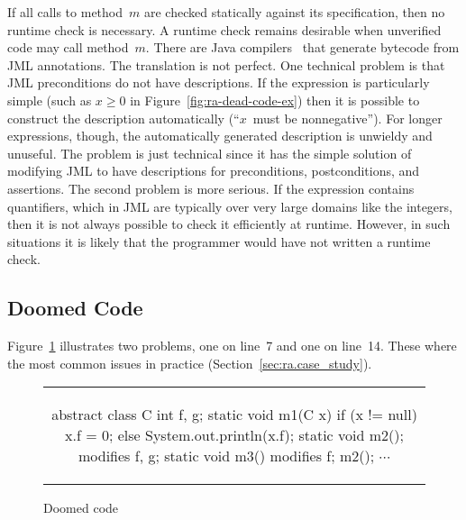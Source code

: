 \documentclass[a4paper]{article}
\newcommand{\bc}{\begin{figure}\centering\begin{tabular}{c}} %
\newcommand{\ec}[2]{\end{tabular}\caption{#1}\label{#2}\end{figure}} %
\theoremstyle{slanted}
\theoremstyle{definition}
\theoremstyle{remark}
\begin{document}
If all calls to method~$m$ are checked statically against its
specification, then no runtime check is necessary. A runtime
check remains desirable when unverified code may call method~$m$.
There are Java compilers~\cite{burdy2005jml} that generate
bytecode from JML annotations. The translation is not perfect.
One technical problem is that JML preconditions do not have
descriptions. If the expression is particularly simple (such as
$x\ge0$ in Figure~\ref{fig:ra-dead-code-ex}) then it is possible
to construct the description automatically (``$x$~must be
nonnegative''). For longer expressions, though, the automatically
generated description is unwieldy and unuseful. The problem is
just technical since it has the simple solution of modifying
JML to have descriptions for preconditions, postconditions, and
assertions. The second problem is more serious. If the expression
contains quantifiers, which in JML are typically over very large
domains like the integers, then it is not always possible to
check it efficiently at runtime. However, in such situations it
is likely that the programmer would have not written a runtime
check.


\subsection{Doomed Code}

Figure~\ref{fig:ra-doomed-code-ex} illustrates two problems, one
on line~7 and one on line~14. These where the most common issues
in practice (Section~\ref{sec:ra.case_study}).

\bc
\begin{jml}
abstract class C {
  int f, g;
  static void m1(C x) {
    if (x != null)
      x.f = 0;
    else
      System.out.println(x.f);
  }
  static void m2();
    modifies f, g;
  static void m3()
    modifies f;
  {
    m2();
    $\cdots$
  }
}
\end{jml}
\ec{Doomed code}{fig:ra-doomed-code-ex}
\end{document}
